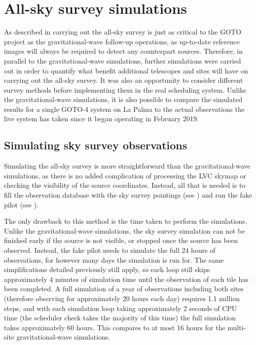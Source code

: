 \section{All-sky survey simulations}
\label{sec:survey_sims}
\begin{colsection}


\begin{colsection}

As described in  carrying out the all-sky survey is just as critical to the GOTO project as the gravitational-wave follow-up operations, as up-to-date reference images will always be required to detect any counterpart sources. Therefore, in parallel to the gravitational-wave simulations, further simulations were carried out in order to quantify what benefit additional telescopes and sites will have on carrying out the all-sky survey. It was also an opportunity to consider different survey methods before implementing them in the real scheduling system. Unlike the gravitational-wave simulations, it is also possible to compare the simulated results for a single GOTO-4 system on La Palma to the actual observations the live system has taken since it began operating in February 2019.

\end{colsection}


\subsection{Simulating sky survey observations}
\label{sec:survey_sim_methods}
\begin{colsection}

Simulating the all-sky survey is more straightforward than the gravitational-wave simulations, as there is no added complication of processing the LVC skymap or checking the visibility of the source coordinates. Instead, all that is needed is to fill the observation database with the sky survey pointings (see ) and run the fake pilot (see ).

The only drawback to this method is the time taken to perform the simulations. Unlike the gravitational-wave simulations, the sky survey simulation can not be finished early if the source is not visible, or stopped once the source has been observed. Instead, the fake pilot needs to simulate the full 24 hours of observations, for however many days the simulation is run for. The same simplifications detailed previously still apply, so each loop still skips approximately 4 minutes of simulation time until the observation of each tile has been completed. A full simulation of a year of observations including both sites (therefore observing for approximately 20 hours each day) requires 1.1 million steps, and with each simulation loop taking approximately 2 seconds of CPU time (the scheduler check takes the majority of this time) the full simulation takes approximately 60 hours. This compares to at most 16 hours for the multi-site gravitational-wave simulations.


\end{colsection}
\end{colsection}
